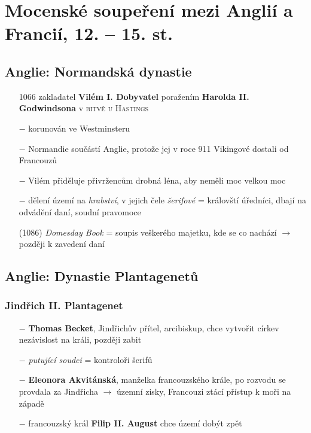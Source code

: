 \documentclass{article}
\begin{document}
\section*{Mocenské soupeření mezi Anglií a Francií, 12. -- 15. st.}
\subsection*{Anglie: Normandská dynastie}
\begin{itemize}
    \vspace{-0.5em}
    \setlength\itemsep{0.15em}
    \item[1066] zakladatel \textbf{Vilém I. Dobyvatel} poražením \textbf{Harolda II. Godwindsona} v \textsc{bitvě u Hastings}
    \item[$-$] korunován ve Westminsteru
    \item[$-$] Normandie součástí Anglie, protože jej v roce 911 Vikingové dostali od Francouzů
    \item[$-$] Vilém přiděluje přivržencům drobná léna, aby neměli moc velkou moc
    \item[$-$] dělení území na \textit{hrabství}, v jejich čele \textit{šerifové} = královští úředníci, dbají na odvádění daní, soudní pravomoce
    \item[(1086)] \textit{Domesday Book} = soupis veškerého majetku, kde se co nachází $\rightarrow$ později k zavedení daní
\end{itemize}


\subsection*{Anglie: Dynastie Plantagenetů}
\subsubsection*{Jindřich II. Plantagenet}
\begin{itemize}
    \vspace{-0.5em}
    \setlength\itemsep{0.15em}
    \item[$-$] \textbf{Thomas Becket}, Jindřichův přítel, arcibiskup, chce vytvořit církev nezávislost na králi, později zabit
    \item[$-$] \textit{putující soudci} = kontroloři šerifů
    \item[$-$] \textbf{Eleonora Akvitánská}, manželka francouzského krále, po rozvodu se provdala za Jindřicha $\rightarrow$ územní zisky, Francouzi ztácí přístup k moři na západě
    \item[$-$] francouzský král \textbf{Filip II. August} chce území dobýt zpět
\end{itemize}
\end{document}
